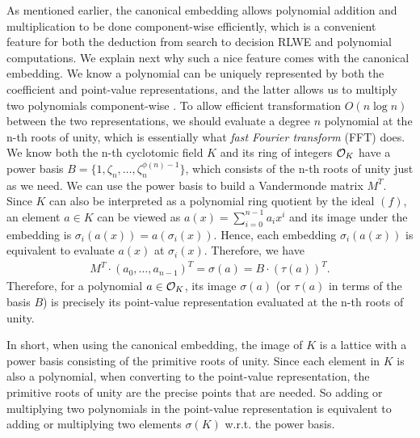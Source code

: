 \documentclass[../main.tex]{subfiles}
\begin{document}
As mentioned earlier, the canonical embedding allows polynomial addition and multiplication to be done component-wise efficiently, which is a convenient feature for both the deduction from search to decision RLWE and polynomial computations. We explain next why such a nice feature comes with the canonical embedding. We know a polynomial can be uniquely represented by both the coefficient and point-value representations, and the latter allows us to multiply two polynomials component-wise \cite{cormen01introduction}.
To allow efficient transformation $O(n\log n)$ between the two representations, we should evaluate a degree $n$ polynomial at the n-th roots of unity, which is essentially what \textit{fast Fourier transform} (FFT) does. We know both the n-th cyclotomic field $K$ and its ring of integers $\mathcal{O}_K$ have a power basis $B=\{1, \zeta_n, \dots, \zeta_n^{\phi(n)-1}\}$, which consists of the n-th roots of unity just as we need. 
We can use the power basis to build a Vandermonde matrix $M^T$. 
Since $K$ can also be interpreted as a polynomial ring quotient by the ideal $(f)$, an element $a \in K$ can be viewed as $a(x) = \sum_{i=0}^{n-1} a_i x^i$ and its image under the embedding is $\sigma_i(a(x))=a(\sigma_i(x))$. Hence, each embedding $\sigma_i(a(x))$ is equivalent to evaluate $a(x)$ at $\sigma_i(x)$. Therefore, we have 
\begin{align*}
    M^T \cdot (a_0, \dots, a_{n-1})^T = \sigma(a) = B \cdot (\tau(a))^T. 
\end{align*}
Therefore, for a polynomial $a \in \mathcal{O}_K$, its image $\sigma(a)$ (or $\tau(a)$ in terms of the basis $B$) is precisely its point-value representation evaluated at the n-th roots of unity.   

In short, when using the canonical embedding, the image of $K$ is a lattice with a power basis consisting of the primitive roots of unity. Since each element in $K$ is also a polynomial, when converting to the point-value representation, the primitive roots of unity are the precise points that are needed. So adding or multiplying two polynomials in the point-value representation is equivalent to adding or multiplying two elements $\sigma(K)$ w.r.t. the power basis.


\end{document}
